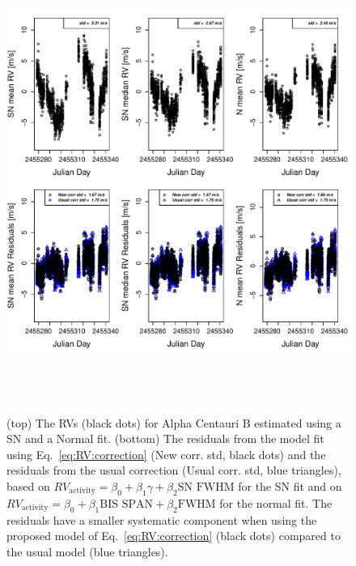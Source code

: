 \documentclass{aa}
\begin{document}
\begin{figure} 
\begin{center}
\includegraphics[height = 6in]{NEW_CORRECTIONHD12862_[3]CorrectionActivity_RadialVelocity_vs_time.pdf} 
   \caption{(top) The RVs (black dots) for Alpha Centauri B estimated using a SN and a Normal fit.
 (bottom) The residuals from the model fit using Eq.~\eqref{eq:RV:correction} (New corr. std, black dots) and the residuals from the usual correction (Usual corr. std, blue triangles), based on $RV_{\text{activity}}=\beta_0+\beta_1 \gamma + \beta_2 \text{SN FWHM}$ for the SN fit and on $RV_{\text{activity}}=\beta_0+\beta_1 \text{BIS SPAN} + \beta_2 \text{FWHM}$ for the normal fit. The residuals have a smaller systematic component when using the proposed model of  Eq.~\eqref{eq:RV:correction} (black dots) compared to the usual model (blue triangles).}
\label{fig:alphacent:correctionRV}
\end{center}
\end{figure}
\end{document}
